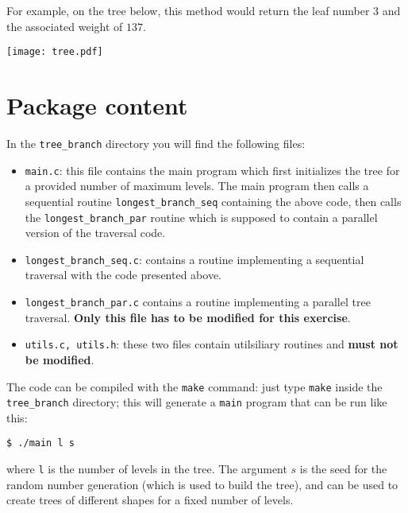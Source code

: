 \documentclass{article}
\begin{document}
For example, on the tree below, this method would return the leaf
number $3$ and the associated weight of $137$.

\begin{center}
  \texttt{[image: tree.pdf]}
\end{center}


\section{Package content}
In the \texttt{tree\_branch} directory you will find the
following files:
\begin{itemize}
\item \texttt{main.c}: this file contains the main program which first
  initializes the tree for a provided number of maximum levels. The main
  program then calls a sequential routine \texttt{longest\_branch\_seq}
  containing the above code, then calls the
  \texttt{longest\_branch\_par} routine which is supposed to contain a
  parallel version of the traversal code.
\item \texttt{longest\_branch\_seq.c}: contains a routine implementing a
  sequential traversal with the code presented above.
\item \texttt{longest\_branch\_par.c} contains a routine implementing a
  parallel tree traversal. \textbf{Only this file has to be modified
    for this exercise}.
\item \texttt{utils.c, utils.h}: these two files contain utilsiliary
  routines and \textbf{must not be modified}.
\end{itemize}



The code can be compiled with the \texttt{make} command: just type
\texttt{make} inside the \texttt{tree\_branch} directory; this
will generate a \texttt{main} program that can be run like this:

\begin{verbatim}
$ ./main l s
\end{verbatim}

where \texttt{l} is the number of levels in the tree. The argument $s$
is the seed for the random number generation (which is used to build
the tree), and can be used to create trees of different shapes for a
fixed number of levels.
\end{document}
